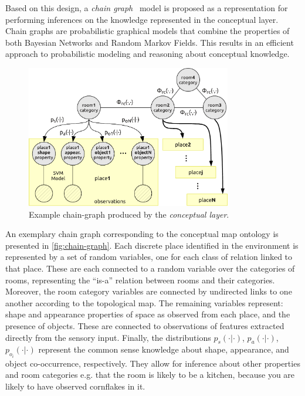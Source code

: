 \documentclass[runningheads,a4paper]{llncs}
\begin{document}
Based on this design, a \emph{chain graph}~\cite{lauritzen2002chain} model is proposed as a 
representation for performing inferences on the knowledge represented in the conceptual 
layer. Chain graphs are probabilistic graphical models that combine the properties of 
both Bayesian Networks and Random Markov Fields. This results in an efficient approach to 
probabilistic modeling and reasoning about conceptual knowledge.

\begin{figure}[h]
\centering
\includegraphics[width=0.80\textwidth]{figures/chaingraph.pdf}
\caption{\label{fig:chain-graph}Example chain-graph produced by the \emph{conceptual layer}.}
\end{figure}

An exemplary chain graph corresponding to the conceptual map ontology is presented
in \autoref{fig:chain-graph}. 
Each discrete place identified in the environment is represented by a set of random variables, 
one for each class of relation linked to that place. These are each connected to a random variable
over the categories of rooms, representing the ``is-a'' relation between rooms and their categories. 
Moreover, the room category variables are connected by undirected links to one another according 
to the topological map. The remaining variables represent: shape and appearance properties of space 
as observed from each place, and the presence of objects. 
These are connected to observations of features extracted directly from 
the sensory input. Finally, the 
distributions $p_{s}(\cdot|\cdot)$, $p_a(\cdot|\cdot)$, $p_{o_i}(\cdot|\cdot)$ 
represent the common sense knowledge about shape, appearance, and object co-occurrence, respectively. 
They allow for inference about other properties and room categories e.g. that the room is likely to be a kitchen,
because you are likely to have observed cornflakes in it. 
\end{document}

